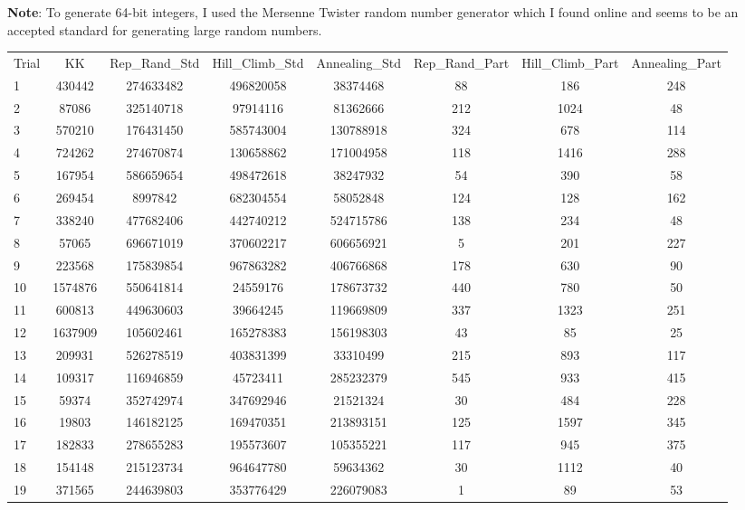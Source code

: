 \documentclass[11pt]{article}
\begin{document}
\textbf{Note}: To generate 64-bit integers, I used the Mersenne Twister random number generator which I found online and seems to be an accepted standard for generating large random numbers. \\

\begin{table}[h!]
\begin{tabular}{p{1cm}|C| C | C | C | C | C | C} 
Trial & KK & Rep\_Rand\_Std & Hill\_Climb\_Std & Annealing\_Std & Rep\_Rand\_Part & Hill\_Climb\_Part & Annealing\_Part \\ 
1 & 430442 & 274633482 & 496820058 & 38374468 & 88 & 186 & 248 \\ 
2 & 87086 & 325140718 & 97914116 & 81362666 & 212 & 1024 & 48 \\ 
3 & 570210 & 176431450 & 585743004 & 130788918 & 324 & 678 & 114 \\ 
4 & 724262 & 274670874 & 130658862 & 171004958 & 118 & 1416 & 288 \\ 
5 & 167954 & 586659654 & 498472618 & 38247932 & 54 & 390 & 58 \\ 
6 & 269454 & 8997842 & 682304554 & 58052848 & 124 & 128 & 162 \\ 
7 & 338240 & 477682406 & 442740212 & 524715786 & 138 & 234 & 48 \\ 
8 & 57065 & 696671019 & 370602217 & 606656921 & 5 & 201 & 227 \\ 
9 & 223568 & 175839854 & 967863282 & 406766868 & 178 & 630 & 90 \\ 
10 & 1574876 & 550641814 & 24559176 & 178673732 & 440 & 780 & 50 \\ 
11 & 600813 & 449630603 & 39664245 & 119669809 & 337 & 1323 & 251 \\ 
12 & 1637909 & 105602461 & 165278383 & 156198303 & 43 & 85 & 25 \\ 
13 & 209931 & 526278519 & 403831399 & 33310499 & 215 & 893 & 117 \\ 
14 & 109317 & 116946859 & 45723411 & 285232379 & 545 & 933 & 415 \\ 
15 & 59374 & 352742974 & 347692946 & 21521324 & 30 & 484 & 228 \\ 
16 & 19803 & 146182125 & 169470351 & 213893151 & 125 & 1597 & 345 \\ 
17 & 182833 & 278655283 & 195573607 & 105355221 & 117 & 945 & 375 \\ 
18 & 154148 & 215123734 & 964647780 & 59634362 & 30 & 1112 & 40 \\ 
19 & 371565 & 244639803 & 353776429 & 226079083 & 1 & 89 & 53 \\ 

\end{tabular}
\end{table}
\end{document}

